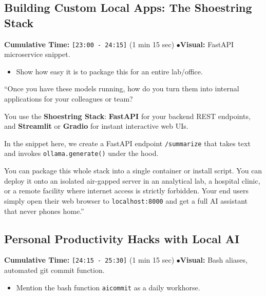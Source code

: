 \documentclass[11pt,a4paper]{article}
\begin{document}
\subsection{Building Custom Local Apps: The Shoestring Stack}
\begin{directionbox}
    \textbf{Cumulative Time:} \texttt{[23:00 - 24:15]} (1 min 15 sec) \quad$\bullet$\quad \textbf{Visual:} FastAPI microservice snippet.
    \begin{itemize}
        \item Show how easy it is to package this for an entire lab/office.
    \end{itemize}
\end{directionbox}

\begin{speechbox}
``Once you have these models running, how do you turn them into internal applications for your colleagues or team?

You use the \textbf{Shoestring Stack}: \textbf{FastAPI} for your backend REST endpoints, and \textbf{Streamlit} or \textbf{Gradio} for instant interactive web UIs.

In the snippet here, we create a FastAPI endpoint \texttt{/summarize} that takes text and invokes \texttt{ollama.generate()} under the hood.

You can package this whole stack into a single container or install script. You can deploy it onto an isolated air-gapped server in an analytical lab, a hospital clinic, or a remote facility where internet access is strictly forbidden. Your end users simply open their web browser to \texttt{localhost:8000} and get a full AI assistant that never phones home.''
\end{speechbox}

\subsection{Personal Productivity Hacks with Local AI}
\begin{directionbox}
    \textbf{Cumulative Time:} \texttt{[24:15 - 25:30]} (1 min 15 sec) \quad$\bullet$\quad \textbf{Visual:} Bash aliases, automated git commit function.
    \begin{itemize}
        \item Mention the bash function \texttt{aicommit} as a daily workhorse.
    \end{itemize}
\end{directionbox}
\end{document}
